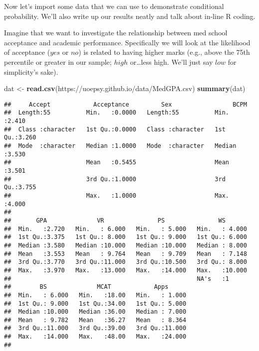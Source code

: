 \documentclass[
]{article}
\newenvironment{Shaded}{\begin{snugshade}}{\end{snugshade}}
\newcommand{\FunctionTok}[1]{\textcolor[rgb]{0.13,0.29,0.53}{\textbf{#1}}}
\newcommand{\NormalTok}[1]{#1}
\newcommand{\OtherTok}[1]{\textcolor[rgb]{0.56,0.35,0.01}{#1}}
\newcommand{\StringTok}[1]{\textcolor[rgb]{0.31,0.60,0.02}{#1}}
\begin{document}
Now let's import some data that we can use to demonstrate conditional
probability. We'll also write up our results neatly and talk about
in-line R coding.

Imagine that we want to investigate the relationship between med school
acceptance and academic performance. Specifically we will look at the
likelihood of acceptance (\(yes\) or \(no\)) is related to having higher
marks (e.g., above the 75th percentile or greater in our sample;
\(high\) or\ldots less high. We'll just say \(low\) for simplicity's
sake).

\begin{Shaded}
\begin{Highlighting}[]
\NormalTok{dat }\OtherTok{\textless{}{-}} \FunctionTok{read.csv}\NormalTok{(}\StringTok{\textquotesingle{}https://uoepsy.github.io/data/MedGPA.csv\textquotesingle{}}\NormalTok{)}
\FunctionTok{summary}\NormalTok{(dat)}
\end{Highlighting}
\end{Shaded}

\begin{verbatim}
##     Accept            Acceptance         Sex                 BCPM      
##  Length:55          Min.   :0.0000   Length:55          Min.   :2.410  
##  Class :character   1st Qu.:0.0000   Class :character   1st Qu.:3.260  
##  Mode  :character   Median :1.0000   Mode  :character   Median :3.530  
##                     Mean   :0.5455                      Mean   :3.501  
##                     3rd Qu.:1.0000                      3rd Qu.:3.755  
##                     Max.   :1.0000                      Max.   :4.000  
##                                                                        
##       GPA              VR               PS               WS        
##  Min.   :2.720   Min.   : 6.000   Min.   : 5.000   Min.   : 4.000  
##  1st Qu.:3.375   1st Qu.: 8.000   1st Qu.: 9.000   1st Qu.: 6.000  
##  Median :3.580   Median :10.000   Median :10.000   Median : 8.000  
##  Mean   :3.553   Mean   : 9.764   Mean   : 9.709   Mean   : 7.148  
##  3rd Qu.:3.770   3rd Qu.:11.000   3rd Qu.:10.500   3rd Qu.: 8.000  
##  Max.   :3.970   Max.   :13.000   Max.   :14.000   Max.   :10.000  
##                                                    NA's   :1       
##        BS              MCAT            Apps       
##  Min.   : 6.000   Min.   :18.00   Min.   : 1.000  
##  1st Qu.: 9.000   1st Qu.:34.00   1st Qu.: 5.000  
##  Median :10.000   Median :36.00   Median : 7.000  
##  Mean   : 9.782   Mean   :36.27   Mean   : 8.364  
##  3rd Qu.:11.000   3rd Qu.:39.00   3rd Qu.:11.000  
##  Max.   :14.000   Max.   :48.00   Max.   :24.000  
## 
\end{verbatim}
\end{document}
